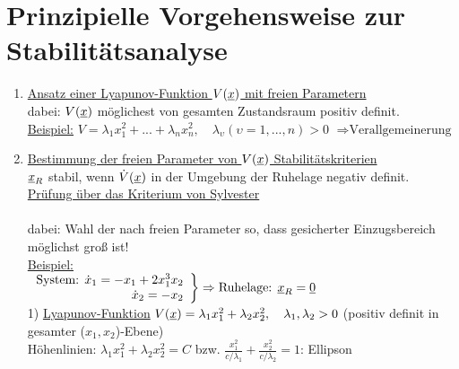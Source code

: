 \documentclass[openany,a4paper,11pt]{book}
\begin{document}
\section[Stabilitätsanalyse]{Prinzipielle Vorgehensweise zur Stabilitätsanalyse}
\begin{enumerate}
    \item \uline{Ansatz einer Lyapunov-Funktion $V(\uline{x})$ mit freien Parametern}\\
    dabei: $V(\uline{x})$ möglichest von gesamten Zustandsraum positiv definit.\\
    \uline{Beispiel:} $V=\lambda_1x_1^2+...+\lambda_nx_n^2,\quad \lambda_\upsilon(\upsilon=1,...,n)>0$
    $\Rightarrow \text{Verallgemeinerung}$
    \begin{minipage}[c]{\textwidth}
        \end{minipage}
    \item \uline{Bestimmung der freien Parameter von $V(\uline{x})$ Stabilitätskriterien}\\
    $\uline{x}_R$ stabil, wenn $\dot{V}(\uline{x})$ in der Umgebung der Ruhelage negativ definit.\\
    \uline{Prüfung über das Kriterium von Sylvester} \\
    \\
    dabei: Wahl der nach freien Parameter so, dass gesicherter Einzugsbereich möglichst groß ist!\\
    \uline{Beispiel:}\\
    $\left.
    \begin{array}{r}
    \text{System: } \dot{x}_1=-x_1+2x_1^3x_2\\
    \dot{x}_2=-x_2\\
    \end{array}
    \right\} \Rightarrow \text{Ruhelage: } \uline{x}_R=\uline{0}$\\
    1) \uline{Lyapunov-Funktion} $V(\uline{x})=\lambda_1x_1^2+\lambda_2x_2^2, \quad \lambda_1,\lambda_2>0$ (positiv definit in gesamter ($x_1,x_2$)-Ebene)\\
    Höhenlinien: $\lambda_1x_1^2+\lambda_2x_2^2=C$ bzw. $\frac{x_1^2}{c/\lambda_1}+\frac{x_2^2}{c/\lambda_2}=1$: Ellipson\\

\end{enumerate}
\end{document}
